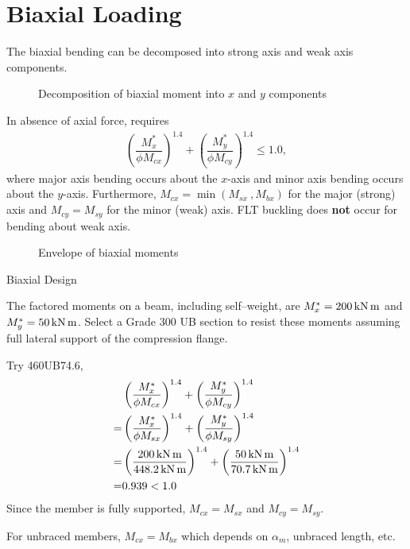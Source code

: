 \section{Biaxial Loading}
The biaxial bending can be decomposed into strong axis and weak axis components.
\begin{figure}[H]
\centering\caption{Decomposition of biaxial moment into $x$ and $y$ components}
\end{figure}
In absence of axial force,  requires
\begin{align}
\left(\dfrac{M^*_x}{\phi{}M_{cx}}\right)^{1.4}+\left(\dfrac{M^*_y}{\phi{}M_{cy}}\right)^{1.4}\leqslant1.0,
\end{align}
where major axis bending occurs about the $x$-axis and minor axis bending occurs about the $y$-axis.
Furthermore, $M_{cx}=\min\left(M_{sx}~,M_{bx}\right)$ for the major (strong) axis and $M_{cy}=M_{sy}$ for the minor (weak) axis.
FLT buckling does \textbf{not} occur for bending about weak axis.
\begin{figure}[H]
\centering\caption{Envelope of biaxial moments}
\end{figure}
\clearpage
\begin{exmp}
Biaxial Design

The factored moments on a beam, including self--weight, are $M^*_x=\SI{200}{\kilo\newton\meter}$ and $M^*_y=\SI{50}{\kilo\newton\meter}$.
Select a Grade 300 UB section to resist these moments assuming full lateral support of the compression flange.
\end{exmp}
\begin{solution}
Try 460UB74.6,
\begin{align*}
&\left(\dfrac{M^*_x}{\phi{}M_{cx}}\right)^{1.4}+\left(\dfrac{M^*_y}{\phi{}M_{cy}}\right)^{1.4}\\
=&\left(\dfrac{M^*_x}{\phi{}M_{sx}}\right)^{1.4}+\left(\dfrac{M^*_y}{\phi{}M_{sy}}\right)^{1.4}\\
=&\left(\dfrac{\SI{200}{\kilo\newton\meter}}{\SI{448.2}{\kilo\newton\meter}}\right)^{1.4}+\left(\dfrac{\SI{50}{\kilo\newton\meter}}{\SI{70.7}{\kilo\newton\meter}}\right)^{1.4}\\
=&0.939<1.0
\end{align*}
Since the member is fully supported, $M_{cx}=M_{sx}$ and $M_{cy}=M_{sy}$.

For unbraced members, $M_{cx}=M_{bx}$ which depends on $\alpha_m$, unbraced length, etc.
\end{solution}

